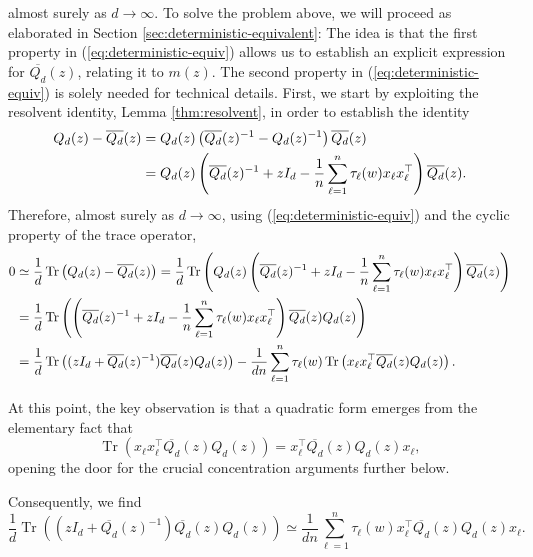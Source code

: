\documentclass{article}
\begin{document}
almost surely as $d\to\infty$. To solve the problem above, we will proceed as elaborated in Section \ref{sec:deterministic-equivalent}: The idea is that the first property in (\ref{eq:deterministic-equiv}) allows us to establish an explicit expression for $\overline{Q_d}(z)$, relating it to $m(z)$. The second property in (\ref{eq:deterministic-equiv}) is solely needed for technical details. First, we start by exploiting the resolvent identity, Lemma \ref{thm:resolvent}, in order to establish the identity
\begin{align}
Q_d(z)-\overline{Q_d}(z) &= Q_d(z)\left(\overline{Q_d}(z)^{-1}-Q_d(z)^{-1}\right)\overline{Q_d}(z) \notag
\\ &= Q_d(z)\left(\overline{Q_d}(z)^{-1}+zI_d-\frac{1}{n}\sum_{\ell=1}^n \tau_\ell(w) x_\ell x_\ell^\top\right)\overline{Q_d}(z).
\end{align}
Therefore, almost surely as $d\to\infty$, using (\ref{eq:deterministic-equiv}) and the cyclic property of the trace operator,
\begin{align}
0&\simeq\frac{1}{d}\operatorname{Tr}\left(Q_d(z)-\overline{Q_d}(z)\right) =\frac{1}{d}\operatorname{Tr}\left(Q_{d}(z)\left(\overline{Q_{d}}(z)^{-1}+zI_{d}-\frac{1}{n}\sum_{\ell=1}^n\tau_\ell(w) x_\ell x_\ell^\top\right)\overline{Q_{d}}(z)\right) \notag
\\&= \frac{1}{d}\operatorname{Tr}\left(\left(\overline{Q_{d}}(z)^{-1}+zI_{d}-\frac{1}{n}\sum_{\ell=1}^n\tau_\ell(w) x_\ell x_\ell^\top\right)\overline{Q_{d}}(z)Q_{d}(z)\right) \notag
\\&= \frac{1}{d}\operatorname{Tr}\left((zI_{d}+\overline{Q_{d}}(z)^{-1})\overline{Q_{d}}(z)Q_{d}(z)\right)-\frac{1}{dn}\sum_{\ell=1}^n\tau_\ell(w)\operatorname{Tr}\left(x_\ell x_\ell^\top\overline{Q_d}(z)Q_d(z)\right).
\end{align}
\par
At this point, the key observation is that a quadratic form emerges from the elementary fact that
\begin{equation}
\operatorname{Tr}(x_\ell x_\ell^\top\overline{Q_d}(z)Q_d(z)) = x_\ell^\top\overline{Q_d}(z)Q_d(z)x_\ell,
\end{equation}
opening the door for the crucial concentration arguments further below.
\par
Consequently, we find
\begin{equation}
\frac{1}{d}\operatorname{Tr}\left((zI_d+\overline{Q_d}(z)^{-1})\overline{Q_d}(z)Q_d(z)\right)\simeq \frac{1}{dn}\sum_{\ell=1}^n\tau_\ell(w) x_\ell^\top\overline{Q_d}(z)Q_d(z)x_\ell.\label{eq:trace-sim}
\end{equation}
\end{document}
